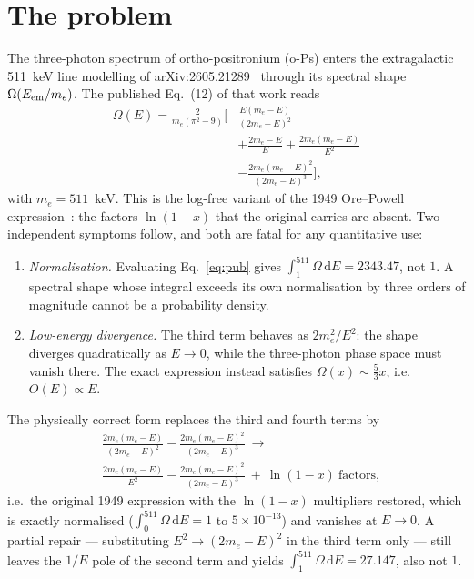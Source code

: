 \documentclass[twocolumn]{svjour3}
\begin{document}
\section{The problem}
The three-photon spectrum of ortho-positronium (o-Ps) enters the
extragalactic 511~keV line modelling of
arXiv:2605.21289~\cite{sy26} through its spectral shape
$\Omega(E_{\rm em}/m_e)$. The published Eq.~(12) of that work reads
\begin{equation}
\label{eq:pub}
\begin{split}
\Omega(E) = \frac{2}{m_e(\pi^2-9)}\biggl[&
\frac{E(m_e-E)}{(2m_e-E)^2} \\
&+ \frac{2m_e-E}{E} + \frac{2m_e(m_e-E)}{E^2} \\
&- \frac{2m_e(m_e-E)^2}{(2m_e-E)^3}\biggr],
\end{split}
\end{equation}
with $m_e = 511$~keV. This is the log-free variant of the 1949
Ore--Powell expression~\cite{ore49}: the factors
$\ln(1-x)$ that the original carries are absent. Two independent
symptoms follow, and both are fatal for any quantitative use:
\begin{enumerate}
    \item \emph{Normalisation.} Evaluating Eq.~\eqref{eq:pub} gives
    $\int_{1}^{511}\Omega\,\mathrm{d}E = 2343.47$, not $1$. A spectral
    shape whose integral exceeds its own normalisation by three orders
    of magnitude cannot be a probability density.
    \item \emph{Low-energy divergence.} The third term behaves as
    $2m_e^2/E^2$: the shape diverges quadratically as $E\to 0$, while
    the three-photon phase space must vanish there. The exact
    expression instead satisfies $\Omega(x)\sim\tfrac{5}{3}x$, i.e.\
    $O(E)\propto E$.
\end{enumerate}
The physically correct form replaces the third and fourth terms by
\begin{equation}
\label{eq:corr}
\begin{split}
&\frac{2m_e(m_e-E)}{(2m_e-E)^2}
- \frac{2m_e(m_e-E)^2}{(2m_e-E)^3}
\ \longrightarrow\ \\
&\frac{2m_e(m_e-E)}{E^2}
- \frac{2m_e(m_e-E)^2}{(2m_e-E)^3}
\ +\ \ln(1-x)\ \text{factors},
\end{split}
\end{equation}
i.e.\ the original 1949 expression with the
$\ln(1-x)$ multipliers restored, which is exactly normalised
($\int_0^{511}\allowbreak\Omega\,\mathrm{d}E = 1$ to $5\times10^{-13}$) and
vanishes at $E\to 0$. A partial repair --- substituting
$E^2\to(2m_e-E)^2$ in the third term only --- still leaves the
$1/E$ pole of the second term and yields
$\int_{1}^{511}\Omega\,\mathrm{d}E = 27.147$, also not $1$.
\end{document}
